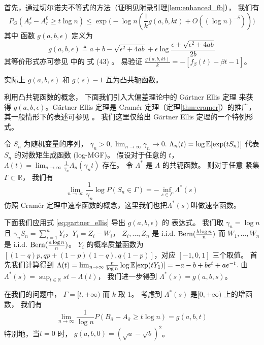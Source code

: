 首先，通过切尔诺夫不等式的方法（证明见附录引理\ref{lem:enhanced_fb}），
我们有
\begin{equation}\label{eq:introduction_g_a_b_eps}
  P_G(A_r^s - A_r^0 \ge t  \log n) 
	\le  \exp\Big(-\log n
	\left(
   \frac{1}{k} g(a,b,kt) + O((\log n)^{-\delta}) \right)\Big)
\end{equation}
其中 函数 $g(a,b,\epsilon)$ 定义为
\begin{equation}  \label{equation:g}
  g(a,b,\epsilon) \triangleq a + b - \sqrt{\epsilon^2 + 4ab} + \epsilon \log \frac{\epsilon + \sqrt{\epsilon^2 + 4ab}}{2b}
\end{equation}
其等价形式亦可参见 \citet{abbe2015exact} 中的 式 (43)
。
易验证 $\frac{g(a,b,kt)}{k}=-[f_{\beta}(t)-\beta t -1]$。
\begin{remark}\label{re:g_beta}
实际上 $g(a,b,s)$ 和 $g(s)-1$ 互为凸共轭函数。

利用凸共轭函数的概念，
下面我们引入大偏差理论中的 Gärtner Ellis 定理
来获得 $g(a,b,\epsilon)$。Gärtner Ellis 定理是
Cramér 定理（定理\ref{thm:cramer}）的推广，其一般情形下的表述可参见
\citet{dembo2009large}。
我们这里仅给出 Gärtner Ellis 定理的一个特例形式。

令 $S_n$ 为随机变量的序列，
$\gamma_n >0, \lim_{n\to \infty}\gamma_n \to 0$.
$\Lambda_n(t)=\log \operatorname{\mathbb{E}}[\exp(t S_n)]$ 代表 $S_n$ 的对数矩生成函数 (log-MGF)。
假设对于任意的 $t$，
$\Lambda(t) =\lim_{n\to \infty} \frac{1}{\gamma_n}\Lambda_n(\gamma_n t)$
存在。 令 $\Lambda^*$ 是 $\Lambda$ 的共轭函数。
则对于任意 紧集 $\Gamma \subset \mathbb{R}$，
我们有
\begin{equation}\label{eq:gartner_ellis}
\lim_{n\to \infty} \frac{1}{\gamma_n}\log P(S_n \in \Gamma) = -\inf_{s \in \Gamma} \Lambda^*(s)
\end{equation}
仿照 Cramér 定理中速率函数的概念，这里我们也把$\Lambda^*(s)$叫做速率函数。

下面我们应用式 \eqref{eq:gartner_ellis}
导出 $g(a,b,\epsilon)$ 的
表达式。
我们取 $\gamma_n= \log n$ 且 $\gamma_n S_n = \sum_{i=1}^n Y_i$，$Y_i=Z_i - W_i$，
$Z_i, \dots, Z_n$ 是 i.i.d. $\operatorname{Bern}(\frac{b \log n}{n})$ 而 $W_1, \dots, W_n$ 是 i.i.d. $\operatorname{Bern}(\frac{a \log n}{n})$。
$Y_i$ 的概率质量函数为 $[(1-q)p, qp+(1-p)(1-q), q(1-p)]$，对应 $[-1,0,1]$ 三个取值。
首先我们计算得到 
$\Lambda(t) = \lim_{n\to \infty} \frac{n}{\log n} \log \operatorname{\mathbb{E}}[\exp(t Y_1)]
=-a-b+be^t  + ae^{-t}$. 由 $\Lambda^*(s) = \sup_{t\in\mathbb{R}} st - \Lambda(t)$，
我们进一步得到 $\Lambda^*(s) = g(a,b,s)$。

在我们的问题中， $\Gamma=[t, +\infty)$ 而 $k$ 取 1。
考虑到 $\Lambda^*(s)$  是$[0,+\infty)$ 上的增函数，
我们有
\begin{equation}
  \lim_{n\to \infty} \frac{1}{\log n} P(B_{\bar{\sigma}}-A_{\bar{\sigma}}\ge t \log n)
  = g(a,b,t)
\end{equation}
特别地，当$t=0$ 时， $g(a,b, 0) = (\sqrt{a} - \sqrt{b})^2$。
\end{remark}
